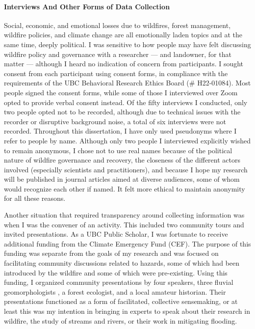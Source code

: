\documentclass[
]{article}
\begin{document}
\paragraph{Interviews And Other Forms of Data Collection}\label{interviews-and-other-forms-of-data-collection}

Social, economic, and emotional losses due to wildfires, forest management, wildfire policies, and climate change are all emotionally laden topics and at the same time, deeply political. I was sensitive to how people may have felt discussing wildfire policy and governance with a researcher --- and landowner, for that matter --- although I heard no indication of concern from participants. I sought consent from each participant using consent forms, in compliance with the requirements of the UBC Behavioral Research Ethics Board (\# H22-01084). Most people signed the consent forms, while some of those I interviewed over Zoom opted to provide verbal consent instead. Of the fifty interviews I conducted, only two people opted not to be recorded, although due to technical issues with the recorder or disruptive background noise, a total of six interviews were not recorded. Throughout this dissertation, I have only used pseudonyms where I refer to people by name. Although only two people I interviewed explicitly wished to remain anonymous, I chose not to use real names because of the political nature of wildfire governance and recovery, the closeness of the different actors involved (especially scientists and practitioners), and because I hope my research will be published in journal articles aimed at diverse audiences, some of whom would recognize each other if named. It felt more ethical to maintain anonymity for all these reasons.

Another situation that required transparency around collecting information was when I was the convener of an activity. This included two community tours and invited presentations. As a UBC Public Scholar, I was fortunate to receive additional funding from the Climate Emergency Fund (CEF). The purpose of this funding was separate from the goals of my research and was focused on facilitating community discussions related to hazards, some of which had been introduced by the wildfire and some of which were pre-existing. Using this funding, I organized community presentations by four speakers, three fluvial geomorphologists , a forest ecologist, and a local amateur historian. Their presentations functioned as a form of facilitated, collective sensemaking, or at least this was my intention in bringing in experts to speak about their research in wildfire, the study of streams and rivers, or their work in mitigating flooding.
\end{document}
